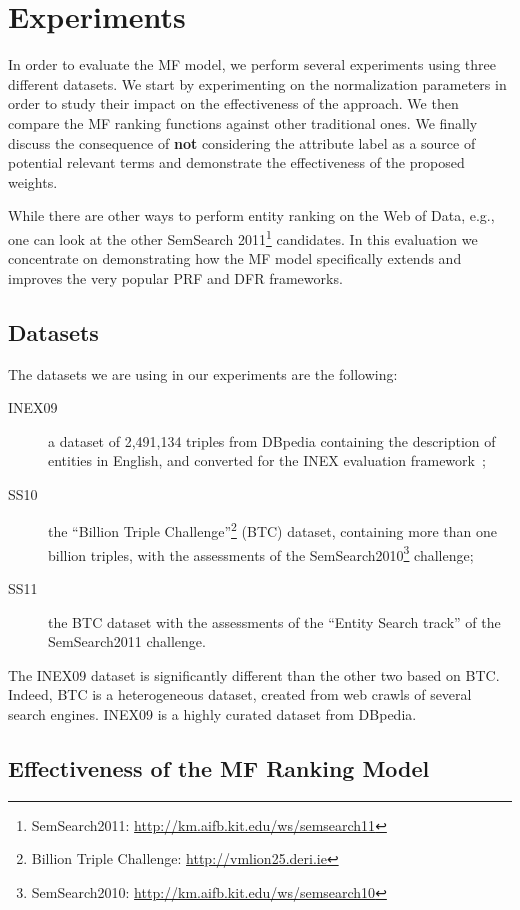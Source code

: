 \section{Experiments}
\label{sec:experiments}

In order to evaluate the MF model, we perform several experiments using three different datasets. We start by experimenting on the normalization parameters in order to study their impact on the effectiveness of the approach. We then compare the MF ranking functions against other traditional ones. We finally discuss the consequence of \textbf{not} considering the attribute label as a source of potential relevant terms and demonstrate the effectiveness of the proposed weights.

While there are other ways to perform entity ranking on the Web of Data, e.g., one can look at the other SemSearch 2011\footnote{SemSearch2011: \url{http://km.aifb.kit.edu/ws/semsearch11}} candidates. In this evaluation we concentrate on demonstrating how the MF model specifically extends and improves the very popular PRF and DFR frameworks.

\subsection{Datasets}
\label{sec:datasets}

The datasets we are using in our experiments are the following:
\begin{description}
  \item[INEX09] a dataset of 2,491,134 triples from DBpedia containing the description of entities in English, and converted for the INEX evaluation framework~\cite{Perez-Aguera:2010:UBS};
  \item[SS10] the ``Billion Triple Challenge''\footnote{Billion Triple Challenge: \url{http://vmlion25.deri.ie}} (BTC) dataset, containing more than one billion triples, with the assessments of the SemSearch2010\footnote{SemSearch2010: \url{http://km.aifb.kit.edu/ws/semsearch10}} challenge;
  \item[SS11] the BTC dataset with the assessments of the ``Entity Search track'' of the SemSearch2011 challenge.
\end{description}
The INEX09 dataset is significantly different than the other two based on BTC. Indeed, BTC is a heterogeneous dataset, created from web crawls of several search engines. INEX09 is a highly curated dataset from DBpedia.

\subsection{Effectiveness of the MF Ranking Model}
\label{sec:mv-fields-effectiveness}

